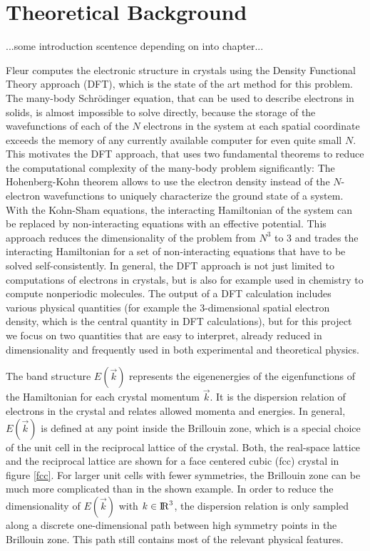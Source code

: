 
\chapter{Theoretical Background}
\label{chap:theory}

...some introduction scentence depending on into chapter...


Fleur computes the electronic structure in crystals using the Density Functional Theory approach (DFT), which is the state of the art method for this problem. The many-body Schrödinger equation, that can be used to describe electrons in solids, is almost impossible to solve directly, because the storage of the wavefunctions of each of the $N$ electrons in the system at each spatial coordinate exceeds the memory of any currently available computer for even quite small $N$. This motivates the DFT approach, that uses two fundamental theorems to reduce the computational complexity of the many-body problem significantly: The Hohenberg-Kohn theorem allows to use the electron density instead of the $N$-electron wavefunctions to uniquely characterize the ground state of a system. With the Kohn-Sham equations, the interacting Hamiltonian of the system can be replaced by non-interacting equations with an effective potential. This approach reduces the dimensionality of the problem from $N^3$ to $3$ and trades the interacting Hamiltonian for a set of non-interacting equations that have to be solved self-consistently. In general, the DFT approach is not just limited to computations of electrons in crystals, but is also for example used in chemistry to compute nonperiodic molecules.
% 
The output of a DFT calculation includes various physical quantities (for example the 3-dimensional spatial electron density, which is the central quantity in DFT calculations), but for this project we focus on two quantities that are easy to interpret, already reduced in dimensionality and frequently used in both experimental and theoretical physics.

The band structure $E(\vec{k})$ represents the eigenenergies of the eigenfunctions of the Hamiltonian for each crystal momentum $\vec{k}$. It is the dispersion relation of electrons in the crystal and relates allowed momenta and energies. In general, $E(\vec{k})$ is defined at any point inside the Brillouin zone, which is a special choice of the unit cell in the reciprocal lattice of the crystal. Both, the real-space lattice and the reciprocal lattice are shown for a face centered cubic (fcc) crystal in figure \ref{fcc}. For larger unit cells with fewer symmetries, the Brillouin zone can be much more complicated than in the shown example. In order to reduce the dimensionality of $E(\vec{k})$ with $k \in {\rm I\!R}^3$, the dispersion relation is only sampled along a discrete one-dimensional path between high symmetry points in the Brillouin zone. This path still contains most of the relevant physical features.

